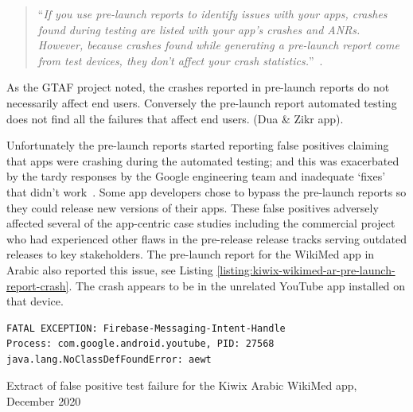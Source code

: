 \begin{quote}
``\emph{If you use pre-launch reports to identify issues with your apps, crashes found during testing are listed with your app’s crashes and ANRs. However, because crashes found while generating a pre-launch report come from test devices, they don’t affect your crash statistics.}''~\citep{play_console_help_view_crashes_2019, play_console_help_understanding_pre_launch_reports_2022}.    
\end{quote}

As the GTAF project noted, the crashes reported in pre-launch reports do not necessarily affect end users. Conversely the pre-launch report automated testing does not find all the failures that affect end users. (Dua \& Zikr app).

Unfortunately the pre-launch reports started reporting false positives claiming that apps were crashing during the automated testing; and this was exacerbated by the tardy responses by the Google engineering team and inadequate `fixes' that didn't work~\citep{google2020_pre-launch-reports-false-positives}. %
Some app developers chose to bypass the pre-launch reports so they could release new versions of their apps. These false positives adversely affected several of the app-centric case studies including the commercial project who had experienced other flaws in the pre-release release tracks serving outdated releases to key stakeholders. The pre-launch report for the WikiMed app in Arabic also reported this issue, see Listing \ref{listing:kiwix-wikimed-ar-pre-launch-report-crash}. The crash appears to be in the unrelated YouTube app installed on that device. 

\begin{listing}
\begin{verbatim}
FATAL EXCEPTION: Firebase-Messaging-Intent-Handle
Process: com.google.android.youtube, PID: 27568
java.lang.NoClassDefFoundError: aewt
\end{verbatim}
\caption{Extract of false positive test failure for the Kiwix Arabic WikiMed app, December 2020}
\label{listing:kiwix-wikimed-ar-pre-launch-report-crash}
\end{listing}

